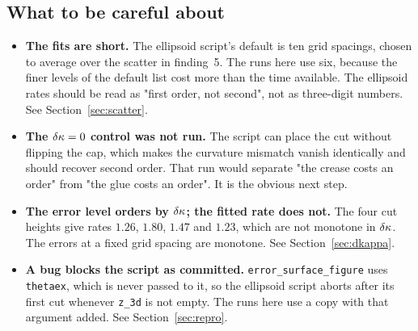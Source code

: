 \subsection*{What to be careful about}

\begin{itemize}
  \item \textbf{The fits are short.} The ellipsoid script's default is
        ten grid spacings, chosen to average over the scatter in
        finding~5. The runs here use six, because the finer levels of the
        default list cost more than the time available. The ellipsoid
        rates should be read as "first order, not second", not as
        three-digit numbers. See Section~\ref{sec:scatter}.
  \item \textbf{The $\delta\kappa=0$ control was not run.} The script can place
        the cut without flipping the cap, which makes the curvature
        mismatch vanish identically and should recover second order.
        That run would separate "the crease costs an order" from "the
        glue costs an order". It is the obvious next step.
  \item \textbf{The error level orders by $\delta\kappa$; the fitted rate does
        not.} The four cut heights give rates $1.26$, $1.80$, $1.47$ and
        $1.23$, which are not monotone in $\delta\kappa$. The errors at a fixed
        grid spacing are monotone. See Section~\ref{sec:dkappa}.
  \item \textbf{A bug blocks the script as committed.}
        \texttt{error\_surface\_figure} uses \texttt{thetaex}, which is
        never passed to it, so the ellipsoid script aborts after its
        first cut whenever \texttt{z\_3d} is not empty. The runs here use
        a copy with that argument added. See Section~\ref{sec:repro}.
\end{itemize}
